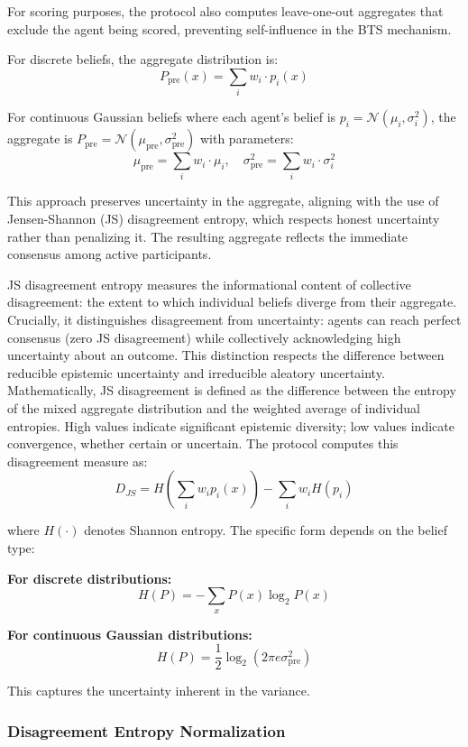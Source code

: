 \documentclass[11pt,a4paper]{article}
\begin{document}
For scoring purposes, the protocol also computes leave-one-out aggregates that exclude the agent being scored, preventing self-influence in the BTS mechanism.

For discrete beliefs, the aggregate distribution is:
$$P_{\text{pre}}(x) = \sum_i w_i \cdot p_i(x)$$

For continuous Gaussian beliefs where each agent's belief is $p_i = \mathcal{N}(\mu_i, \sigma_i^2)$, the aggregate is $P_{\text{pre}} = \mathcal{N}(\mu_{\text{pre}}, \sigma_{\text{pre}}^2)$ with parameters:
$$\mu_{\text{pre}} = \sum_i w_i \cdot \mu_i, \quad \sigma_{\text{pre}}^2 = \sum_i w_i \cdot \sigma_i^2$$

This approach preserves uncertainty in the aggregate, aligning with the use of Jensen-Shannon (JS) disagreement entropy, which respects honest uncertainty rather than penalizing it. The resulting aggregate reflects the immediate consensus among active participants.

JS disagreement entropy measures the informational content of collective disagreement: the extent to which individual beliefs diverge from their aggregate. Crucially, it distinguishes disagreement from uncertainty: agents can reach perfect consensus (zero JS disagreement) while collectively acknowledging high uncertainty about an outcome. This distinction respects the difference between reducible epistemic uncertainty and irreducible aleatory uncertainty. Mathematically, JS disagreement is defined as the difference between the entropy of the mixed aggregate distribution and the weighted average of individual entropies. High values indicate significant epistemic diversity; low values indicate convergence, whether certain or uncertain. The protocol computes this disagreement measure as:
$$D_{JS} = H\left(\sum_i w_i p_i(x)\right) - \sum_i w_i H(p_i)$$

where $H(\cdot)$ denotes Shannon entropy. The specific form depends on the belief type:

\textbf{For discrete distributions:}
$$H(P) = -\sum_x P(x) \log_2 P(x)$$

\textbf{For continuous Gaussian distributions:}
$$H(P) = \frac{1}{2} \log_2(2\pi e \sigma_{\text{pre}}^2)$$

This captures the uncertainty inherent in the variance.

\subsubsection*{Disagreement Entropy Normalization}
\end{document}
